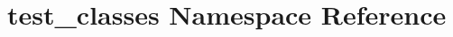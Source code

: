 \hypertarget{namespacetest__classes}{\section{test\-\_\-classes Namespace Reference}
\label{namespacetest__classes}
}
